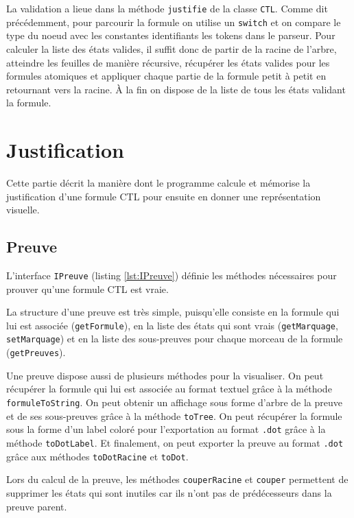 \documentclass[dvipsnames]{report}
\begin{document}
La validation a lieue dans la méthode \texttt{justifie} de la classe \texttt{CTL}. Comme dit précédemment, pour parcourir la formule on utilise un \texttt{switch} et on compare le type du noeud avec les constantes identifiants les tokens dans le parseur. Pour calculer la liste des états valides, il suffit donc de partir de la racine de l'arbre, atteindre les feuilles de manière récursive, récupérer les états valides pour les formules atomiques et appliquer chaque partie de la formule petit à petit en retournant vers la racine. \`{A} la fin on dispose de la liste de tous les états validant la formule.


\section{Justification}

Cette partie décrit la manière dont le programme calcule et mémorise la justification d'une formule CTL pour ensuite en donner une représentation visuelle.

\subsection{Preuve}

L'interface \texttt{IPreuve} (listing \ref{lst:IPreuve}) définie les méthodes nécessaires pour prouver qu'une formule CTL est vraie. 

La structure d'une preuve est très simple, puisqu'elle consiste en la formule qui lui est associée (\texttt{getFormule}), en la liste des états qui sont vrais (\texttt{getMarquage}, \texttt{setMarquage}) et en la liste des sous-preuves pour chaque morceau de la formule (\texttt{getPreuves}).

Une preuve dispose aussi de plusieurs méthodes pour la visualiser. On peut récupérer la formule qui lui est associée au format textuel grâce à la méthode \texttt{formuleToString}. On peut obtenir un affichage sous forme d'arbre de la preuve et de ses sous-preuves grâce à la méthode \texttt{toTree}. On peut récupérer la formule sous la forme d'un label coloré pour l'exportation au format \texttt{.dot} grâce à la méthode \texttt{toDotLabel}. Et finalement, on peut exporter la preuve au format \texttt{.dot} grâce aux méthodes \texttt{toDotRacine} et \texttt{toDot}.

Lors du calcul de la preuve, les méthodes \texttt{couperRacine} et \texttt{couper} permettent de supprimer les états qui sont inutiles car ils n'ont pas de prédécesseurs dans la preuve parent.
\end{document}
